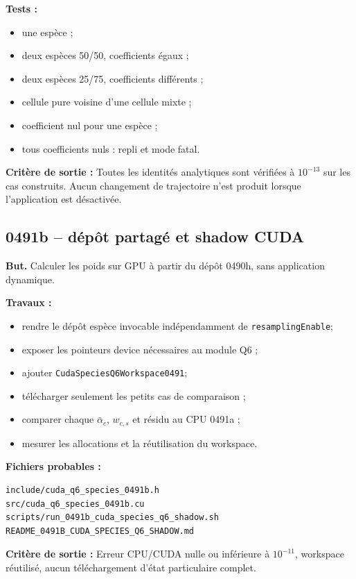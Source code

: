 \documentclass[11pt,a4paper]{article}
\newcommand{\code}[1]{\texttt{#1}}
\newcommand{\criterion}[1]{\colorbox{softgreen}{\parbox{0.93\linewidth}{\textbf{Critère de sortie :} #1}}}
\begin{document}
\textbf{Tests :}
\begin{itemize}
  \item une espèce ;
  \item deux espèces 50/50, coefficients égaux ;
  \item deux espèces 25/75, coefficients différents ;
  \item cellule pure voisine d'une cellule mixte ;
  \item coefficient nul pour une espèce ;
  \item tous coefficients nuls : repli et mode fatal.
\end{itemize}

\criterion{Toutes les identités analytiques sont vérifiées à $10^{-13}$ sur les cas construits. Aucun changement de trajectoire n'est produit lorsque l'application est désactivée.}

\subsection{0491b -- dépôt partagé et shadow CUDA}

\textbf{But.} Calculer les poids sur GPU à partir du dépôt 0490h, sans application dynamique.

\textbf{Travaux :}
\begin{itemize}
  \item rendre le dépôt espèce invocable indépendamment de \code{resamplingEnable};
  \item exposer les pointeurs device nécessaires au module Q6 ;
  \item ajouter \code{CudaSpeciesQ6Workspace0491};
  \item télécharger seulement les petits cas de comparaison ;
  \item comparer chaque \(\bar\alpha_c\), \(w_{c,s}\) et résidu au CPU 0491a ;
  \item mesurer les allocations et la réutilisation du workspace.
\end{itemize}

\textbf{Fichiers probables :}
\begin{lstlisting}
include/cuda_q6_species_0491b.h
src/cuda_q6_species_0491b.cu
scripts/run_0491b_cuda_species_q6_shadow.sh
README_0491B_CUDA_SPECIES_Q6_SHADOW.md
\end{lstlisting}

\criterion{Erreur CPU/CUDA nulle ou inférieure à $10^{-11}$, workspace réutilisé, aucun téléchargement d'état particulaire complet.}
\end{document}
